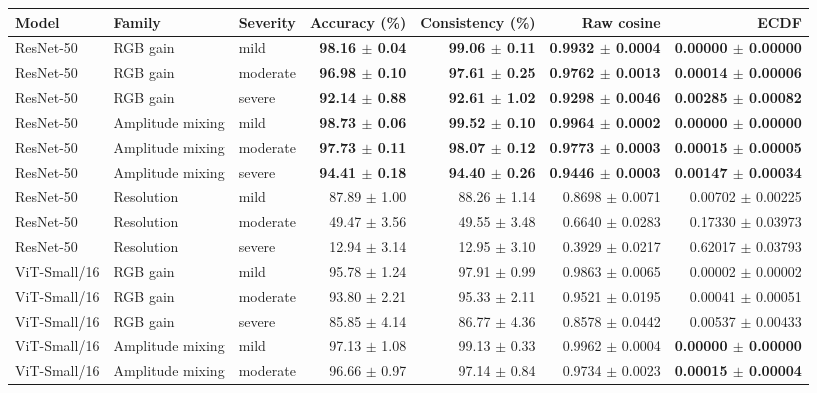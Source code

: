 \begin{tabular}{lllrrrr}
\toprule
Model & Family & Severity & Accuracy (\%) & Consistency (\%) & Raw cosine & ECDF \\
\midrule
ResNet-50 & RGB gain & mild & \textbf{98.16 $\pm$ 0.04} & \textbf{99.06 $\pm$ 0.11} & \textbf{0.9932 $\pm$ 0.0004} & \textbf{0.00000 $\pm$ 0.00000} \\
ResNet-50 & RGB gain & moderate & \textbf{96.98 $\pm$ 0.10} & \textbf{97.61 $\pm$ 0.25} & \textbf{0.9762 $\pm$ 0.0013} & \textbf{0.00014 $\pm$ 0.00006} \\
ResNet-50 & RGB gain & severe & \textbf{92.14 $\pm$ 0.88} & \textbf{92.61 $\pm$ 1.02} & \textbf{0.9298 $\pm$ 0.0046} & \textbf{0.00285 $\pm$ 0.00082} \\
ResNet-50 & Amplitude mixing & mild & \textbf{98.73 $\pm$ 0.06} & \textbf{99.52 $\pm$ 0.10} & \textbf{0.9964 $\pm$ 0.0002} & \textbf{0.00000 $\pm$ 0.00000} \\
ResNet-50 & Amplitude mixing & moderate & \textbf{97.73 $\pm$ 0.11} & \textbf{98.07 $\pm$ 0.12} & \textbf{0.9773 $\pm$ 0.0003} & \textbf{0.00015 $\pm$ 0.00005} \\
ResNet-50 & Amplitude mixing & severe & \textbf{94.41 $\pm$ 0.18} & \textbf{94.40 $\pm$ 0.26} & \textbf{0.9446 $\pm$ 0.0003} & \textbf{0.00147 $\pm$ 0.00034} \\
ResNet-50 & Resolution & mild & 87.89 $\pm$ 1.00 & 88.26 $\pm$ 1.14 & 0.8698 $\pm$ 0.0071 & 0.00702 $\pm$ 0.00225 \\
ResNet-50 & Resolution & moderate & 49.47 $\pm$ 3.56 & 49.55 $\pm$ 3.48 & 0.6640 $\pm$ 0.0283 & 0.17330 $\pm$ 0.03973 \\
ResNet-50 & Resolution & severe & 12.94 $\pm$ 3.14 & 12.95 $\pm$ 3.10 & 0.3929 $\pm$ 0.0217 & 0.62017 $\pm$ 0.03793 \\
ViT-Small/16 & RGB gain & mild & 95.78 $\pm$ 1.24 & 97.91 $\pm$ 0.99 & 0.9863 $\pm$ 0.0065 & 0.00002 $\pm$ 0.00002 \\
ViT-Small/16 & RGB gain & moderate & 93.80 $\pm$ 2.21 & 95.33 $\pm$ 2.11 & 0.9521 $\pm$ 0.0195 & 0.00041 $\pm$ 0.00051 \\
ViT-Small/16 & RGB gain & severe & 85.85 $\pm$ 4.14 & 86.77 $\pm$ 4.36 & 0.8578 $\pm$ 0.0442 & 0.00537 $\pm$ 0.00433 \\
ViT-Small/16 & Amplitude mixing & mild & 97.13 $\pm$ 1.08 & 99.13 $\pm$ 0.33 & 0.9962 $\pm$ 0.0004 & \textbf{0.00000 $\pm$ 0.00000} \\
ViT-Small/16 & Amplitude mixing & moderate & 96.66 $\pm$ 0.97 & 97.14 $\pm$ 0.84 & 0.9734 $\pm$ 0.0023 & \textbf{0.00015 $\pm$ 0.00004} \\

\end{tabular}
